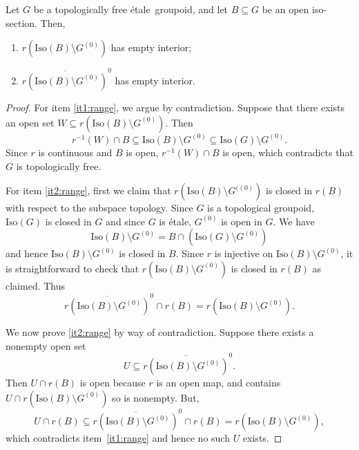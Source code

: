 \documentclass[10pt,a4paper]{amsart}
\newcommand{\Iso}{\mathrm{Iso}}
\newcommand{\etale}{{\'e}tale}
\begin{document}
\begin{lemma}\label{range of isosection}
    Let $G$ be a topologically free \etale\ groupoid, and let $B \subseteq G$ be an open iso-section. Then, 
    \begin{enumerate} 
    \item\label{it1:range} $r(\Iso(B)\setminus G^{(0)})$ has empty interior;
    \item\label{it2:range}$\overline{r(\Iso(B)\setminus G^{(0)})}^0$ has empty interior.  
    \end{enumerate}
\end{lemma}

\begin{proof}  
    For item \eqref{it1:range}, we argue by contradiction. Suppose that there exists an open set $W\subseteq r(\Iso(B)\setminus G^{(0)})$. Then 
    \[r^{-1}(W) \cap B \subseteq \Iso(B) \setminus G^{(0)} \subseteq \Iso(G) \setminus G^{(0)}.\] 
    Since $r$ is continuous and $B$ is open, $r^{-1}(W) \cap B$ is open, which contradicts that $G$ is topologically free.

    For item \eqref{it2:range},
    first we claim that $r(\Iso(B) \setminus G^{((0)})$ is closed in $r(B)$ with respect to the subspace topology. 
     Since $G$ is a topological groupoid, $\Iso(G)$ is closed in $G$ and since $G$ is \'etale, $G^{(0)}$ is open in $G$. We have
     \[
     \Iso(B) \setminus G^{(0)} = B \cap (\Iso(G) \setminus G^{(0)}) 
     \] 
and hence  $\Iso(B) \setminus G^{(0)}$ is closed in $B$.  
     Since $r$ is injective on $\Iso(B)\setminus G^{(0)}$,  it is straightforward to check that $r(\Iso(B) \setminus G^{(0)})$ is closed in $r(B)$ as claimed.  Thus  
     \[\overline{r(\Iso(B)\setminus G^{(0)})}^0 \cap r(B) = r(\Iso(B) \setminus G^{(0)}).\]
     
     We now prove \eqref{it2:range} by way of contradiction. 
 Suppose there exists a nonempty open set 
     \[U \subseteq \overline{r(\Iso(B)\setminus G^{(0)})}^0.
     \]
     Then $U \cap r(B)$ is open because $r$ is an open map, and contains $U \cap r(\Iso(B) \setminus G^{(0)})$ so is nonempty.  But,
\[U \cap r(B) \subseteq \overline{r(\Iso(B)\setminus G^{(0)})}^0  \cap r(B)=r(\Iso(B) \setminus G^{(0)}), \] which contradicts item~\eqref{it1:range} and hence no such $U$ exists.  
\end{proof}
\end{document}
